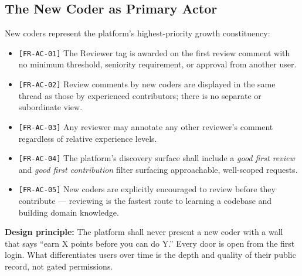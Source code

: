 \documentclass[12pt,a4paper]{article}
\begin{document}
\subsection{The New Coder as Primary Actor}
New coders represent the platform's highest-priority growth constituency:
\begin{itemize}
  \item \texttt{[FR-AC-01]} The Reviewer tag is awarded on the first review comment with no minimum threshold, seniority requirement, or approval from another user.
  \item \texttt{[FR-AC-02]} Review comments by new coders are displayed in the same thread as those by experienced contributors; there is no separate or subordinate view.
  \item \texttt{[FR-AC-03]} Any reviewer may annotate any other reviewer's comment regardless of relative experience levels.
  \item \texttt{[FR-AC-04]} The platform's discovery surface shall include a \emph{good first review} and \emph{good first contribution} filter surfacing approachable, well-scoped requests.
  \item \texttt{[FR-AC-05]} New coders are explicitly encouraged to review before they contribute --- reviewing is the fastest route to learning a codebase and building domain knowledge.
\end{itemize}

\begin{infobox}
\textbf{Design principle:} The platform shall never present a new coder with a wall that says ``earn X points before you can do Y.'' Every door is open from the first login. What differentiates users over time is the depth and quality of their public record, not gated permissions.
\end{infobox}
\end{document}

